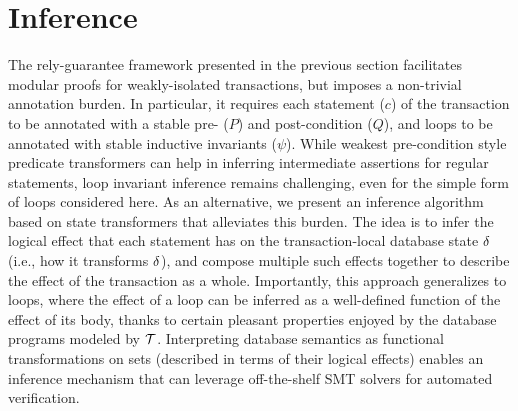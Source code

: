 \section{Inference}
\label{sec:inference}

The rely-guarantee framework presented in the previous section
facilitates modular proofs for weakly-isolated transactions, but
imposes a non-trivial annotation burden.  In particular, it requires
each statement ($c$) of the transaction to be annotated with a stable
pre- ($P$) and post-condition ($Q$), and loops to be annotated with
stable inductive invariants ($\psi$). While weakest pre-condition
style predicate transformers can help in inferring intermediate
assertions for regular statements, loop invariant inference remains
challenging, even for the simple form of loops considered here.  As an
alternative, we present an inference algorithm based on state
transformers that alleviates this burden.  The idea is to infer the
logical effect that each statement has on the transaction-local
database state $\delta$ (i.e., how it transforms $\delta$), and compose
multiple such effects together to describe the effect of the
transaction as a whole.  Importantly, this approach generalizes to
loops, where the effect of a loop can be inferred as a well-defined
function of the effect of its body, thanks to certain pleasant
properties enjoyed by the database programs modeled by $\mbox{${\mathcal T}$}$.
Interpreting database semantics as functional transformations on sets
(described in terms of their logical effects) enables an inference
mechanism that can leverage off-the-shelf SMT solvers for automated
verification.



